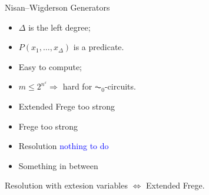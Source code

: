 \begin{frame}{Nisan--Wigderson Generators}

    \begin{minipage}{0.48\linewidth}
        \centering
        
    \end{minipage}
    \begin{minipage}{0.48\linewidth}
        \begin{itemize}
            \item $\Delta$ is the left degree;
            \item $P(x_1, \dots, x_{\Delta})$ is a predicate.
        \end{itemize}
        
        \vspace{0.2cm}
        \pause
        \begin{itemize}
            \item Easy to compute;
            \item $m \le 2^{n^{\varepsilon}} \Rightarrow$ hard for $\AC_0$-circuits.
        \end{itemize}
    \end{minipage}

    \pause
    \vspace{0.3cm}
    \begin{minipage}{0.38\linewidth}
        \begin{itemize}
            \item Extended Frege \pause \alert{too strong}
                \pause
            \item Frege \pause \alert{too strong}
                \pause
            \item Resolution \pause \textcolor{blue}{nothing to do}
                \pause
            \item Something in between
        \end{itemize}
    \end{minipage}
    \pause
    \begin{minipage}{0.56\linewidth}
        \begin{lemma}
            Resolution with extesion variables $\Leftrightarrow$ Extended Frege.
        \end{lemma}
    \end{minipage}
\end{frame}


